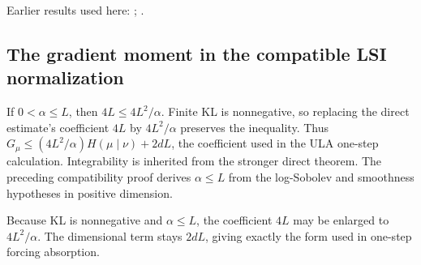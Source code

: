 \documentclass[11pt,a4paper]{report}
\begin{document}
Earlier results used here: \cite[Section~3.26.2]{LangevinLean2026ULASC}; \cite[Section~3.26.3]{LangevinLean2026ULASC}.
\subsection{\texorpdfstring{The gradient moment in the compatible LSI normalization}{The gradient moment in the compatible LSI normalization}}
\label{report-step-UnadjustedLangevin-LSI-EntropyMoment-lean-10}


If \(0<\alpha\le L\), then \(4L\le4L^2/\alpha\). Finite KL is nonnegative, so replacing the direct estimate's coefficient \(4L\) by \(4L^2/\alpha\) preserves the inequality. Thus \(G_\mu\le(4L^2/\alpha)H(\mu\mid\nu)+2dL\), the coefficient used in the ULA one-step calculation. Integrability is inherited from the stronger direct theorem. The preceding compatibility proof derives \(\alpha\le L\) from the log-Sobolev and smoothness hypotheses in positive dimension.



Because KL is nonnegative and \(\alpha\le L\), the coefficient \(4L\) may be enlarged to \(4L^2/\alpha\). The dimensional term stays \(2dL\), giving exactly the form used in one-step forcing absorption.
\end{document}
